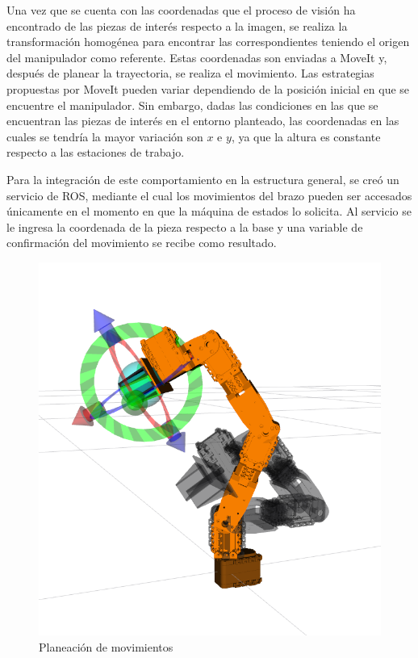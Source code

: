 Una vez que se cuenta con las coordenadas que el proceso de visión ha encontrado de las piezas de interés respecto a la imagen, se realiza la transformación homogénea para encontrar las correspondientes teniendo el origen del manipulador como referente. Estas coordenadas son enviadas a MoveIt y, después de planear la trayectoria, se realiza el movimiento. Las estrategias propuestas por MoveIt pueden variar dependiendo de la posición inicial en que se encuentre el manipulador. Sin embargo, dadas las condiciones en las que se encuentran las piezas de interés en el entorno planteado, las coordenadas en las cuales se tendría la mayor variación son $x$ e $y$, ya que la altura es constante respecto a las estaciones de trabajo. 

Para la integración de este comportamiento en la estructura general, se creó un servicio de ROS, mediante el cual los movimientos del brazo pueden ser accesados únicamente en el momento en que la máquina de estados lo solicita. Al servicio se le ingresa la coordenada de la pieza respecto a la base y una variable de confirmación del movimiento se recibe como resultado. 

\begin{figure}[H]
    \centering
    \includegraphics[scale=0.2]{Figures/Arm_MovPlan.png}
        \caption{Planeación de movimientos}
        \label{fig:Arm_MovPlan}
\end{figure}

